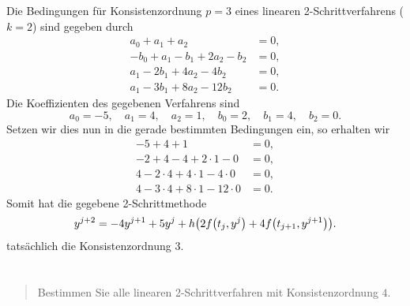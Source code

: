 \documentclass{exercise}
\begin{document}
	Die Bedingungen für Konsistenzordnung \(p = 3\) eines linearen 2-Schrittverfahrens (\(k = 2\)) sind gegeben durch
	\begin{align*}
		a_0 + a_1 + a_2 &= 0,\\
		-b_0 + a_1 - b_1 + 2a_2 - b_2 &= 0,\\
		a_1 - 2b_1 + 4a_2 - 4b_2 &= 0,\\
		a_1 - 3b_1 + 8a_2 - 12b_2 &= 0.
	\end{align*}
	Die Koeffizienten des gegebenen Verfahrens sind
	\[
		a_0 = -5, \quad a_1 = 4, \quad a_2 = 1, \quad b_0 = 2, \quad b_1 = 4, \quad b_2 = 0.
	\]
	Setzen wir dies nun in die gerade bestimmten Bedingungen ein, so erhalten wir
	\begin{align*}
		-5 + 4 + 1 &= 0,\\
		-2 + 4 - 4 + 2 \cdot 1 - 0 &= 0,\\
		4 - 2 \cdot 4 + 4 \cdot 1 - 4 \cdot 0 &= 0,\\
		4 - 3 \cdot 4 + 8 \cdot 1 - 12 \cdot 0 &= 0.
	\end{align*}
	Somit hat die gegebene 2-Schrittmethode
	\[
		y^{j + 2} = -4y^{j + 1} + 5y^j + h\parentheses*{2f\parentheses*{t_j, y^j} + 4f\parentheses*{t_{j + 1}, y^{j + 1}}}.
	\]
	tatsächlich die Konsistenzordnung \(3\).


	\section{}

	\begin{quote}
		Bestimmen Sie alle linearen 2-Schrittverfahren mit Konsistenzordnung \(4\).
	\end{quote}
\end{document}
